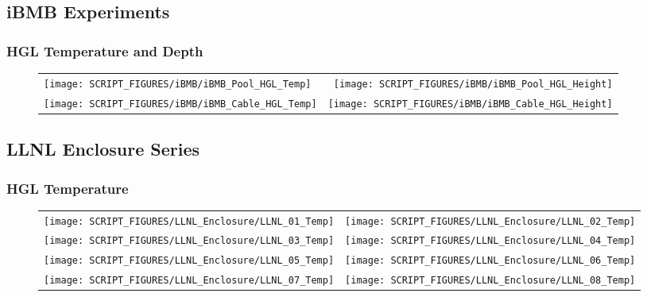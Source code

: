 \clearpage

\subsection{iBMB Experiments}

\subsubsection{HGL Temperature and Depth}

\begin{figure}[!ht]
\begin{tabular*}{\textwidth}{l@{\extracolsep{\fill}}r}
\texttt{[image: SCRIPT\_FIGURES/iBMB/iBMB\_Pool\_HGL\_Temp]} &
\texttt{[image: SCRIPT\_FIGURES/iBMB/iBMB\_Pool\_HGL\_Height]} \\
\texttt{[image: SCRIPT\_FIGURES/iBMB/iBMB\_Cable\_HGL\_Temp]} &
\texttt{[image: SCRIPT\_FIGURES/iBMB/iBMB\_Cable\_HGL\_Height]}
\end{tabular*}
\end{figure}

\clearpage

\subsection{LLNL Enclosure Series}

\subsubsection{HGL Temperature}

\begin{figure}[!ht]
\begin{tabular*}{\textwidth}{l@{\extracolsep{\fill}}r}
\texttt{[image: SCRIPT\_FIGURES/LLNL\_Enclosure/LLNL\_01\_Temp]} &
\texttt{[image: SCRIPT\_FIGURES/LLNL\_Enclosure/LLNL\_02\_Temp]} \\
\texttt{[image: SCRIPT\_FIGURES/LLNL\_Enclosure/LLNL\_03\_Temp]} &
\texttt{[image: SCRIPT\_FIGURES/LLNL\_Enclosure/LLNL\_04\_Temp]} \\
\texttt{[image: SCRIPT\_FIGURES/LLNL\_Enclosure/LLNL\_05\_Temp]} &
\texttt{[image: SCRIPT\_FIGURES/LLNL\_Enclosure/LLNL\_06\_Temp]} \\
\texttt{[image: SCRIPT\_FIGURES/LLNL\_Enclosure/LLNL\_07\_Temp]} &
\texttt{[image: SCRIPT\_FIGURES/LLNL\_Enclosure/LLNL\_08\_Temp]}
\end{tabular*}
\label{LLNL_Enclosure_Temp_1}
\end{figure}

